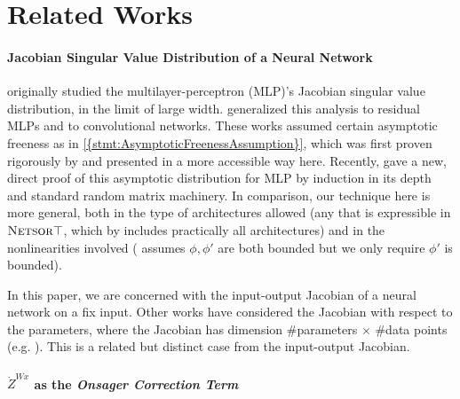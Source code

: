 \documentclass{article}
\newcommand{\Zdot}{\dot Z}
\theoremstyle{definition}
\theoremstyle{remark}
\newcommand{\trsp}{\top}
\newcommand{\netsort}{\texorpdfstring{{$\textsc{Netsor}\trsp$}}{NetsorT}}
\begin{document}










\section{Related Works}

\paragraph{Jacobian Singular Value Distribution of a Neural Network}
\citet{pennington_resurrecting_2017,pennington_emergence_2018} originally studied the multilayer-perceptron (MLP)'s Jacobian singular value distribution, in the limit of large width.
\citet{tarnowski_dynamical_2018,ling_spectrum_2019} generalized this analysis to residual MLPs and \citet{xiao_dynamical_2018} to convolutional networks.
These works assumed certain asymptotic freeness as in \cref{{stmt:AsymptoticFreenessAssumption}}, which was first proven rigorously by \citet{yangScalingLimitsWide2019arXiv.org} and presented in a more accessible way here.
Recently, \citet{pastur2020random} gave a new, direct proof of this asymptotic distribution for MLP by induction in its depth and standard random matrix machinery.
In comparison, our technique here is more general, both in the type of architectures allowed (any that is expressible in \netsort{}, which by \citet{yangTP1,yangTP2} includes practically all architectures) and in the nonlinearities involved (\citet{pastur2020random} assumes $\phi, \phi'$ are both bounded but we only require $\phi'$ is bounded).

In this paper, we are concerned with the input-output Jacobian of a neural network on a fix input. 
Other works have considered the Jacobian with respect to the parameters, where the Jacobian has dimension \#parameters $\times$ \#data points (e.g. \citep{pennington_spectrum_2018}). This is a related but distinct case from the input-output Jacobian.

\paragraph*{$\Zdot^{Wx}$ as the \emph{Onsager Correction Term}}
\end{document}
